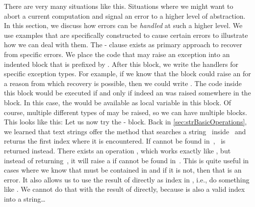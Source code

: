 There are very many situations like this.
Situations where we might want to abort a current computation and signal an error to a higher level of abstraction.
In this section, we discuss how errors can be \emph{handled} at such a higher level.
We use examples that are specifically constructed to cause certain errors to illustrate how we can deal with them.%
%
%
%
The \nobreakdashes- clause exists as primary approach to recover from specific errors.
We place the code that may raise an exception into an indented block that is prefixed by .
After this block, we write the handlers for specific exception types.
For example, if we know that the  block could raise an  for a reason from which recovery is possible, then we could write .
The code inside this  block would be executed if and only if indeed an  was raised somewhere in the  block.
In this case, the  would be available as local variable  in this block.
Of course, multiple different types of  may be raised, so we can have multiple  blocks.
This looks like this:%
%
%
\FloatBarrier%
%
%
%
%
Let us now try the - block.
Back in \cref{sec:strBasicOperations}, we learned that text strings offer the method  that searches a string~ inside~ and returns the first index where it is encountered.
If  cannot be found in~, ~is returned instead.
There exists an operation , which works exactly like , but instead of returning~, it will raise a  if  cannot be found in~.
This is quite useful in cases where we know that  must be contained in  and if it is not, then that is an error.
It also allows us to use the result of  directly as index in , i.e., do something like .
We cannot do that with the result of  directly, because  is also a valid index into a string{\dots}


